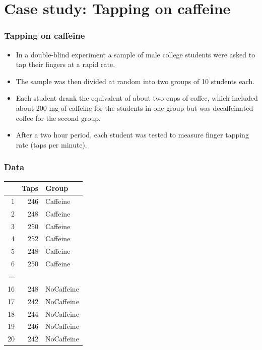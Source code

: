\documentclass[slidestop,compress,mathserif,12pt,t,professionalfonts,xcolor=table]{beamer}
\begin{document}

\section{Case study: Tapping on caffeine}


\begin{frame}
\frametitle{Tapping on caffeine}

\begin{itemize}

\item In a double-blind experiment a sample of male college students were asked to tap their fingers at a rapid rate. 

\item The sample was then divided at random into two groups of 10 students each. 

\item Each student drank the equivalent of about two cups of coffee, which included about 200 mg of caffeine for the students in one group but was decaffeinated coffee for the second group. 

\item After a two hour period, each student was tested to measure finger tapping rate (taps per minute). 

\end{itemize}

\end{frame}


\begin{frame}
\frametitle{Data}

\begin{center}
\begin{tabular}{rrl}
  \hline
 & Taps & Group \\ 
  \hline
1 & 246 & Caffeine \\ 
  2 & 248 & Caffeine \\ 
  3 & 250 & Caffeine \\ 
  4 & 252 & Caffeine \\ 
  5 & 248 & Caffeine \\ 
  6 & 250 & Caffeine \\ 
$\cdots$ && \\
  16 & 248 & NoCaffeine \\ 
  17 & 242 & NoCaffeine \\ 
  18 & 244 & NoCaffeine \\ 
  19 & 246 & NoCaffeine \\ 
  20 & 242 & NoCaffeine \\ 
   \hline
\end{tabular}
\end{center}

\end{frame}
\end{document}
